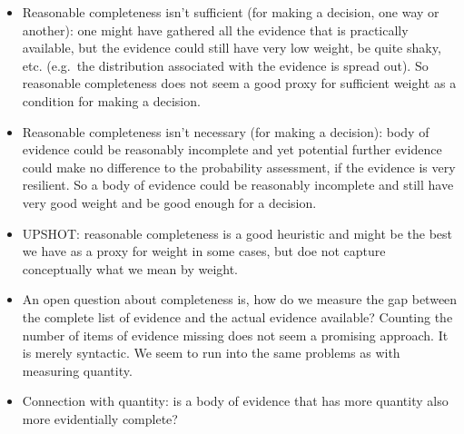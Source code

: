 \documentclass[
  10pt,
  dvipsnames,enabledeprecatedfontcommands]{scrartcl}
\providecommand{\tightlist}{%
  \setlength{\itemsep}{0pt}\setlength{\parskip}{0pt}}
\begin{document}
\begin{itemize}
\item
  Reasonable completeness isn't sufficient (for making a decision, one
  way or another): one might have gathered all the evidence that is
  practically available, but the evidence could still have very low
  weight, be quite shaky, etc. (e.g.~the distribution associated with
  the evidence is spread out). So reasonable completeness does not seem
  a good proxy for sufficient weight as a condition for making a
  decision.
\item
  Reasonable completeness isn't necessary (for making a decision): body
  of evidence could be reasonably incomplete and yet potential further
  evidence could make no difference to the probability assessment, if
  the evidence is very resilient. So a body of evidence could be
  reasonably incomplete and still have very good weight and be good
  enough for a decision.
\item
  UPSHOT: reasonable completeness is a good heuristic and might be the
  best we have as a proxy for weight in some cases, but doe not capture
  conceptually what we mean by weight.
\item
  An open question about completeness is, how do we measure the gap
  between the complete list of evidence and the actual evidence
  available? Counting the number of items of evidence missing does not
  seem a promising approach. It is merely syntactic. We seem to run into
  the same problems as with measuring quantity.
\end{itemize}


\begin{itemize}
\tightlist
\item
  Connection with quantity: is a body of evidence that has more quantity
  also more evidentially complete?
\end{itemize}
\end{document}

